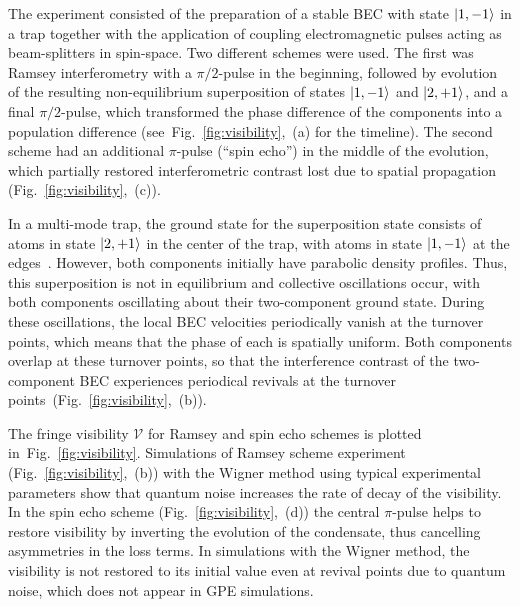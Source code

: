 \documentclass[aps,prl,twocolumn,showpacs,amsmath,amssymb,superscriptaddress]{revtex4-1}
\newcommand{\figref}[1]{Fig.~\ref{#1}}
\newcommand{\ket}[1]{\mbox{\ensuremath{| #1 \rangle}}}
\begin{document}
The experiment consisted of the preparation of a stable BEC with state $\ket{1,-1}$ in a trap
together with the application of coupling electromagnetic pulses acting as beam-splitters in spin-space.
Two different schemes were used.
The first was Ramsey interferometry with a $\pi/2$-pulse in the beginning, followed by
evolution of the resulting non-equilibrium superposition of states $\ket{1,-1}$ and $\ket{2,+1}$,
and a final $\pi/2$-pulse, which transformed the phase difference of the components
into a population difference (see~\figref{fig:visibility},~(a) for the timeline).
The second scheme had an additional $\pi$-pulse (``spin echo'') in the middle of the evolution,
which partially restored interferometric contrast lost due to spatial propagation
(\figref{fig:visibility},~(c)).

In a multi-mode trap, the
ground state for the superposition state consists of atoms in state $\ket{2,+1}$ in the center of the trap,
with atoms in state $\ket{1,-1}$ at the edges~\cite{Mertes2007}.
However, both components initially have parabolic density profiles.
Thus, this superposition is not in equilibrium and collective oscillations occur,
with both components oscillating about their two-component ground state.
During these oscillations, the local BEC velocities periodically vanish at the turnover points,
which means that the phase of each is spatially uniform.
Both components overlap at these turnover points, so that
the interference contrast of the two-component BEC experiences periodical revivals at the
turnover points~(\figref{fig:visibility},~(b)).

The fringe visibility $\mathcal{V}$ for Ramsey and spin echo schemes is plotted in~\figref{fig:visibility}.
Simulations of Ramsey scheme experiment (\figref{fig:visibility},~(b)) with the Wigner method
using typical experimental parameters
show that quantum noise increases the rate of decay of the visibility.
In the spin echo scheme (\figref{fig:visibility},~(d)) the central $\pi$-pulse helps
to restore visibility by inverting the evolution of the condensate, thus cancelling asymmetries in the loss terms.
In simulations with the Wigner method, the visibility is not restored to its initial value even at revival points due to quantum noise, which does not appear in GPE simulations.
\end{document}

